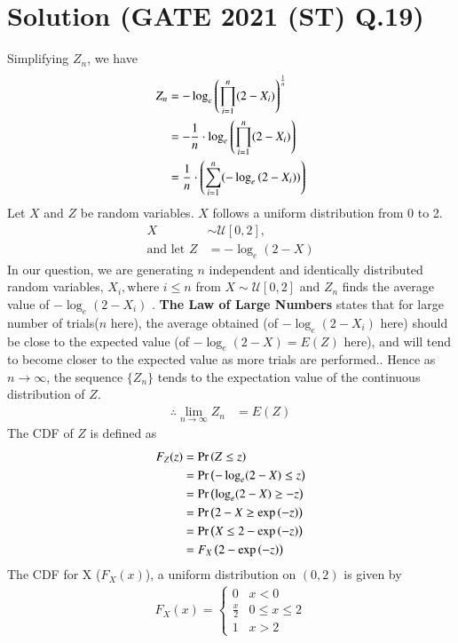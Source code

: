 \documentclass[journal,12pt,twocolumn]{IEEEtran}
\begin{document}
\section{Solution (GATE 2021 (ST) Q.19)}
Simplifying $Z_n$, we have
\begin{align}
    Z_n &= -\log_e \left( \prod\limits_{i=1}^n (2-X_i) \right)^\frac{1}{n}\\
        &= -\frac{1}{n}\cdot \log_e \left( \prod\limits_{i=1}^n (2-X_i) \right)\\
        &= \frac{1}{n}\cdot\left( \sum\limits_{i=1}^n (-\log_e \left( 2-X_i )\right) \right)
\end{align}
Let $X$ and $Z$ be random variables. $X$ follows a uniform distribution from 0 to 2.
\begin{align}
    X &\sim \mathcal{U}[0,2],\\
    \text{and let }    Z&=-\log_e (2-X)
\end{align}
In our question, we are generating $n$ independent and identically distributed random variables, $X_i , \text{where } i \leq n$ from $X \sim \mathcal{U}[0,2]$ and $Z_n$ finds the average value of $-\log_e (2-X_i)$ . \textbf{The Law of Large Numbers} states that for large number of trials($n$ here), the average obtained (of $-\log_e (2-X_i)$ here) should be close to the expected value (of $-\log_e (2-X)=E(Z)$ here), and will tend to become closer to the expected value as more trials are performed.. Hence as $n \to \infty$, the sequence $\{Z_n\} $ tends to the expectation value of the continuous distribution of $Z$.
\begin{align}
    \therefore \lim\limits_{n \to \infty}Z_n&=E(Z)
    \label{Zn_and_Z}
\end{align}
The CDF of $Z$ is defined as 
\begin{align}
    F_Z(z) &= \pr{Z \leq z} \\
           &= \pr{ -\log_e(2-X)\leq z} \\
           &= \pr{\log_e(2-X) \geq -z}\\
           &= \pr{2-X \geq \exp\brak{-z}}\\
           &= \pr{X \leq 2- \exp\brak{-z}}\\
           &= F_X\brak{2- \exp\brak{-z}}
\label{CDF_Z}
\end{align}
The CDF for X ($F_X(x)$), a uniform distribution on $(0,2)$ is given by
\begin{align}
F_X(x) = 
\begin{cases}
0 &  x < 0 \\
\frac{x}{2} & 0 \leq x \leq 2 \\
1 & x > 2
\end{cases}
\end{align}
\end{document}
